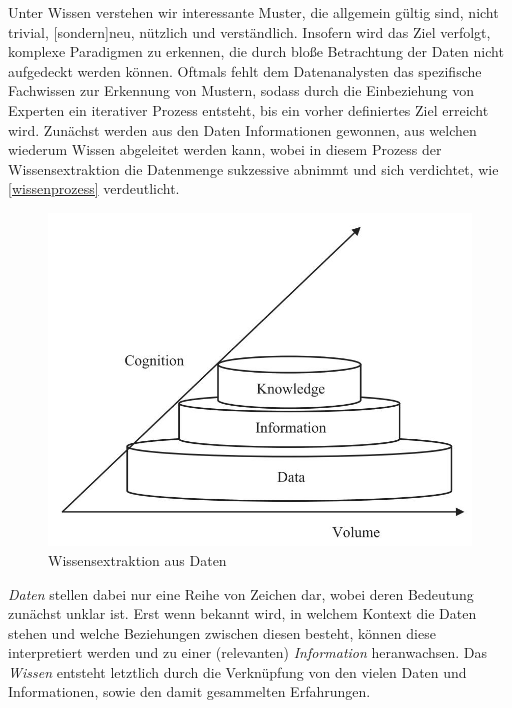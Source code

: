 \glqq Unter Wissen verstehen wir interessante Muster, die allgemein gültig sind, nicht trivial, [sondern]neu, nützlich und verständlich.\grqq{} Insofern wird das Ziel verfolgt, komplexe Paradigmen zu erkennen, die durch bloße Betrachtung der Daten nicht aufgedeckt werden können. Oftmals fehlt dem Datenanalysten das spezifische Fachwissen zur Erkennung von Mustern, sodass durch die Einbeziehung von Experten ein iterativer Prozess entsteht, bis ein vorher definiertes Ziel erreicht wird. Zunächst werden aus den Daten Informationen gewonnen, aus welchen wiederum Wissen abgeleitet werden kann, wobei in diesem Prozess der Wissensextraktion die Datenmenge sukzessive abnimmt und sich verdichtet, wie \vref{wissenprozess} verdeutlicht.

\begin{figure}[H]
\centering
\includegraphics[scale=1.3]{se-wa-jpg/wissenprozess}
\caption[Wissensextraktion aus Daten]{Wissensextraktion aus Daten\protect\footnotemark}
\label{wissenprozess}
\end{figure}

\textit{Daten} stellen dabei nur eine Reihe von Zeichen dar, wobei deren Bedeutung zunächst unklar ist. Erst wenn bekannt wird, in welchem Kontext die Daten stehen und welche Beziehungen zwischen diesen besteht, können diese interpretiert werden und zu einer (relevanten) \textit{Information} heranwachsen. Das \textit{Wissen} entsteht letztlich durch die Verknüpfung von den vielen Daten und Informationen, sowie den damit gesammelten Erfahrungen.

